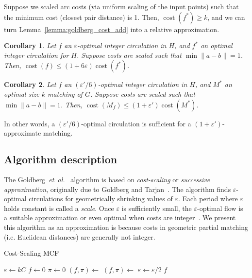 \documentclass[11pt]{article}
\def\etal{\textsl{et~al.}}
\def\eps{\varepsilon}
\theoremstyle{plain}
\newtheorem{corollary}{Corollary}
\def\cost{\operatorname{cost}}
\begin{document}
Suppose we scaled arc costs (via uniform scaling of the input points) such that
the minimum cost (closest pair distance) is 1.
Then, $\cost(f^*) \geq k$, and we can turn Lemma~\ref{lemma:goldberg_cost_add}
into a relative approximation.

\begin{corollary}
\label{corollary:flow_approx}
Let $f$ an $\eps$-optimal integer circulation in $H$, and $f^*$ an optimal
integer circulation for $H$.
Suppose costs are scaled such that $\min \|a - b\| = 1$.
Then, $\cost(f) \leq (1 + 6\eps) \cost(f^*)$.
\end{corollary}

\begin{corollary}
\label{corollary:match_approx}
Let $f$ an $(\eps'/6)$-optimal integer circulation in $H$, and $M^*$ an optimal
size $k$ matching of $G$.
Suppose costs are scaled such that $\min \|a - b\| = 1$.
Then, $\cost(M_f) \leq (1 + \eps') \cost(M^*)$.
\end{corollary}

In other words, a $(\eps'/6)$-optimal circulation is sufficient for a
$(1 + \eps')$-approximate matching.

\subsection{Algorithm description}

The Goldberg~{\etal}~\cite{GHKT17} algorithm is based on \emph{cost-scaling} or
\emph{successive approximation}, originally due to Goldberg and
Tarjan~\cite{GT90}.
The algorithm finds $\eps$-optimal circulations for geometrically shrinking
values of $\eps$.
Each period where $\eps$ holds constant is called a \emph{scale}.
Once $\eps$ is sufficiently small, the $\eps$-optimal flow is a suitable
approximation or even optimal when costs are integer~\cite{GT90,GHKT17}.
We present this algorithm as an approximation is because costs in geometric
partial matching (i.e. Euclidean distances) are generally not integer.

\begin{algorithm}
\caption{Cost-Scaling MCF}
\begin{algorithmic}[1]
\Function{MCF}{$H$, $\eps'$}
	\State $\eps \gets kC$
	\State $f \gets 0$
	\State $\pi \gets 0$
	\Repeat
		\State $(f, \pi) \gets$ 
		\State $(f, \pi) \gets$ 
		\State $\eps \gets \eps/2$
	\Until{$\eps \leq \eps'/6$}
	\State\Return $f$
\EndFunction
\end{algorithmic}
\end{algorithm}
\end{document}
